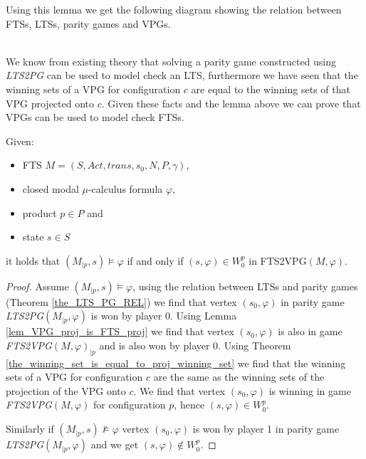 Using this lemma we get the following diagram showing the relation between FTSs, LTSs, parity games and VPGs.\\
\\
We know from existing theory that solving a parity game constructed using \textit{LTS2PG} can be used to model check an LTS, furthermore we have seen that the winning sets of a VPG for configuration $c$ are equal to the winning sets of that VPG projected onto $c$. Given these facts and the lemma above we can prove that VPGs can be used to model check FTSs.
\begin{theorem}
	\label{the_FTS2VPG_is_correct} Given:
	\begin{itemize}
		\item FTS $M = (S,Act,trans,s_0,N,P,\gamma)$,
		\item closed modal $\mu$-calculus formula $\varphi$,
		\item product $p \in P$ and
		\item state $s \in S$
	\end{itemize}
it holds that $(M_{|p},s) \models \varphi$ if and only if $(s,\varphi) \in W_0^p$ in FTS2VPG$(M,\varphi)$.
\begin{proof}
	Assume $(M_{|p},s) \models \varphi$, using the relation between LTSs and parity games (Theorem \ref{the_LTS_PG_REL}) we find that vertex $(s_0,\varphi)$ in parity game \textit{LTS2PG}$(M_{|p},\varphi)$ is won by player 0. Using Lemma \ref{lem_VPG_proj_is_FTS_proj} we find that vertex $(s_0,\varphi)$ is also in game \textit{FTS2VPG}$(M,\varphi)_{|p}$ and is also won by player 0. Using Theorem \ref{the_winning_set_is_equal_to_proj_winning_set} we find that the winning sets of a VPG for configuration $c$ are the same as the winning sets of the projection of the VPG onto $c$. We find that vertex $(s_0,\varphi)$ is winning in game \textit{FTS2VPG}$(M,\varphi)$ for configuration $p$, hence $(s,\varphi) \in W_0^p$.
	
	Similarly if $(M_{|p},s) \not\models \varphi$ vertex $(s_0,\varphi)$ is won by player 1 in parity game \textit{LTS2PG}$(M_{|p},\varphi)$ and we get $(s,\varphi) \notin W_0^p$.
\end{proof}
\end{theorem}

